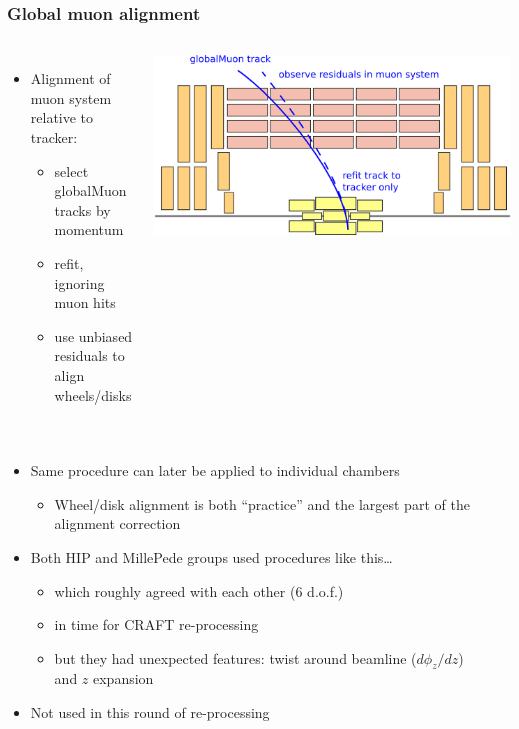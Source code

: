 \documentclass[compress]{beamer}
\begin{document}
\begin{frame}
\frametitle{Global muon alignment}

\begin{columns}
\begin{itemize}
\item Alignment of muon system relative to tracker:
\begin{itemize}\setlength{\itemsep}{0.05 cm}
\item select globalMuon tracks by momentum
\item refit, ignoring muon hits
\item use unbiased residuals to align wheels/disks
\end{itemize}
\end{itemize}

\includegraphics[width=\linewidth]{globalMuons.png}
\end{columns}

\begin{columns}
\begin{itemize}
\item Same procedure can later be applied to individual chambers
\begin{itemize}
\item Wheel/disk alignment is both ``practice'' and the largest part of the alignment correction
\end{itemize}
\item Both HIP and MillePede groups used procedures like this\ldots
\begin{itemize}
\item which roughly agreed with each other (6 d.o.f.)
\item in time for CRAFT re-processing
\item but they had unexpected features: twist around beamline ($d\phi_z/dz$) \\ and $z$ expansion
\end{itemize}
\item Not used in this round of re-processing
\end{itemize}
\end{columns}
\end{frame}
\end{document}
